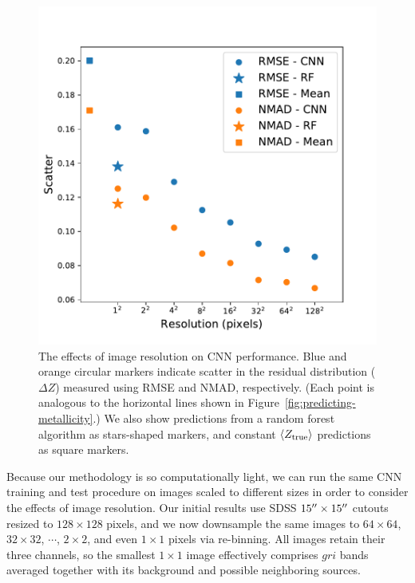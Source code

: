 \documentclass[fleqn,usenatbib]{mnras}
\begin{document}
\begin{figure}
	\includegraphics[width=\columnwidth]{04-resolution.pdf}
	\caption{\label{fig:resolution}
		The effects of image resolution on CNN performance.
		Blue and orange circular markers indicate scatter in the residual distribution ($\Delta Z$) measured using RMSE and NMAD, respectively.
		(Each point is analogous to the horizontal lines shown in Figure~\ref{fig:predicting-metallicity}.)
		We also show predictions from a random forest algorithm as stars-shaped markers, and constant $\langle Z_{\rm true}\rangle$ predictions as square markers.
	}
\end{figure}

Because our methodology is so computationally light, we can run the same CNN training and test procedure on images scaled to different sizes in order to consider the effects of image resolution.
Our initial results use SDSS $15\hbox{$^{\prime\prime}$} \times 15 \hbox{$^{\prime\prime}$}$ cutouts resized to $128\times 128$ pixels, and we now downsample the same images to $64\times 64$, $32 \times 32$, $\cdots$, $2\times 2$, and even $1\times 1$ pixels via re-binning.
All images retain their three channels, so the smallest $1 \times 1$ image effectively comprises $gri$ bands averaged together with its background and possible neighboring sources.
\end{document}
